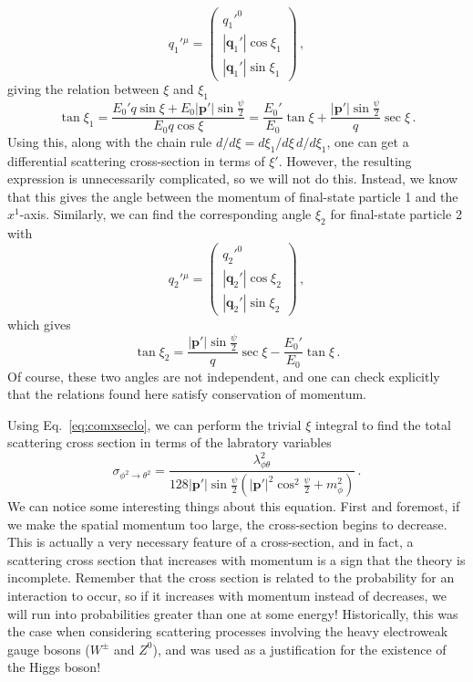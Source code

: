 \documentclass{article}
\numberwithin{equation}{subsection}
\begin{document}
\begin{equation}
	{q_1'}{}^\mu = \begin{pmatrix}
		{q_1'}^0 \\
		|\mathbf{q}_1'|\cos\xi_1 \\
		|\mathbf{q}_1'|\sin\xi_1
	\end{pmatrix}\,,
\end{equation}
giving the relation between $\xi$ and $\xi_1$
\begin{equation}
	\tan\xi_1 = \frac{E_0'q\sin\xi + E_0 |\mathbf{p}'|\sin\frac{\psi}{2}}{E_0 q\cos\xi} = \frac{E_0'}{E_0}\tan\xi + \frac{|\mathbf{p}'|\sin\frac{\psi}{2}}{q}\sec\xi\,.
\end{equation}
Using this, along with the chain rule $d/d\xi = d\xi_1/d\xi\,d/d\xi_1$, one can get a differential scattering cross-section in terms of $\xi'$. However, the resulting
expression is unnecessarily complicated, so we will not do this. Instead, we know that this gives the angle between the momentum of final-state particle 1 and the $x^1$-axis.
Similarly, we can find the corresponding angle $\xi_2$ for final-state particle 2 with
\begin{equation}
	{q_2'}{}^\mu = \begin{pmatrix}
		{q_2'}^0 \\
		|\mathbf{q}_2'|\cos\xi_2 \\
		|\mathbf{q}_2'|\sin\xi_2
	\end{pmatrix}\,,
\end{equation}
which gives
\begin{equation}
	\tan\xi_2 = \frac{|\mathbf{p}'|\sin\frac{\psi}{2}}{q}\sec\xi - \frac{E_0'}{E_0}\tan\xi\,.
\end{equation}
Of course, these two angles are not independent, and one can check explicitly that the relations found here satisfy conservation of momentum.

Using Eq.~\eqref{eq:comxseclo}, we can perform the trivial $\xi$ integral to find the total scattering cross section in terms of the
labratory variables
\begin{equation}
	\sigma_{\phi^2\to\theta^2} = \frac{\lambda_{\phi\theta}^2}{128|\mathbf{p}'|\sin\frac{\psi}{2}(|\mathbf{p}'|^2\cos^2\frac{\psi}{2} + m_\phi^2)}\,.
\end{equation}
We can notice some interesting things about this equation. First and foremost, if we make the spatial momentum too large, the cross-section begins to decrease.  
This is actually a very necessary feature of a cross-section, and in fact, a scattering cross
section that increases with momentum is a sign that the theory is incomplete. Remember that the cross section is related to the probability for an interaction to occur, so
if it increases with momentum instead of decreases, we will run into probabilities greater than one at some energy! 
Historically, this was the case when considering scattering processes involving the heavy electroweak
gauge bosons ($W^\pm$ and $Z^0$), and was used as a justification for the existence of the Higgs boson!
\end{document}
